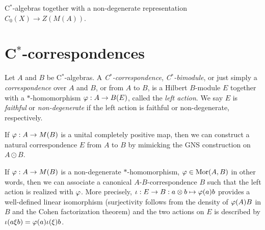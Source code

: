 \documentclass{../../large}
\begin{document}
\begin{prb}
C$^*$-algebras together with a non-degenerate representation $C_0(X)\to Z(M(A))$.
\end{prb}



\begin{prb}
\end{prb}





\section{C$^*$-correspondences}


\begin{prb}[C$^*$-correspondences]
Let $A$ and $B$ be C$^*$-algebras.
A \emph{C$^*$-correspondence}, \emph{C$^*$-bimodule}, or just simply a \emph{correspondence} over $A$ and $B$, or from $A$ to $B$, is a Hilbert $B$-module $E$ together with a $*$-homomorphism $\varphi:A\to B(E)$, called the \emph{left action}.
We say $E$ is \emph{faithful} or \emph{non-degenerate} if the left action is faithful or non-degenerate, respectively.
\begin{parts}
\item If $\varphi:A\to M(B)$ is a unital completely positive map, then we can construct a natural correspondence $E$ from $A$ to $B$ by mimicking the GNS construction on $A\odot B$.
\item If $\varphi:A\to M(B)$ is a non-degenerate $*$-homomorphism, $\varphi\in\operatorname{Mor}(A,B)$ in other words, then we can associate a canonical $A$-$B$-correspondence $B$ such that the left action is realized with $\varphi$.
More precisely, $\iota:E\to B:a\otimes b\mapsto\varphi(a)b$ provides a well-defined linear isomorphism (surjectivity follows from the density of $\varphi(A)B$ in $B$ and the Cohen factorization theorem) and the two actions on $E$ is described by $\iota(a\xi b)=\varphi(a)\iota(\xi)b$.
\end{parts}
\end{prb}
\end{document}
